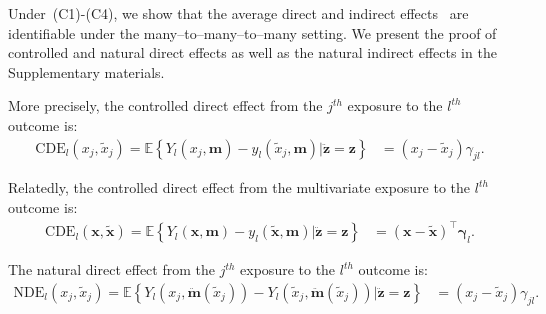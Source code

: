 \documentclass[
  12pt]{article}
\def\E{\mathbb{E}}
\def\M{\mathbf{m}}
\def\m{\mathbf{m}}
\def\Y{\mathbf{y}}
\def\Z{\mathbf{z}}
\begin{document}

Under~(C1)-(C4), we show that the average direct and indirect effects~\citep{imai2010identification,vanderweele2015explanation} are identifiable under the many--to--many--to--many setting. We present the proof of controlled and natural direct effects as well as the natural indirect effects in the Supplementary materials.

More precisely, the controlled direct effect from the $j^{th}$ exposure to the $l^{th}$ outcome is:
\begin{align*}
\text{CDE}_l(x_j, \widetilde{x}_j) =
\E \left \{ Y_l(x_j, \m) -y_l(\widetilde{x}_j, \m) \big| \ddot{\mathbf{z}} = \mathbf{z} \right \}
&= (x_j - \widetilde{x}_j) \gamma_{jl}.
\nonumber
\end{align*}

Relatedly, the controlled direct effect from the multivariate exposure to the $l^{th}$ outcome is:
\begin{align*}
\text{CDE}_l(\mathbf{x}, \widetilde{\mathbf{x}}) = \E \left \{ Y_l(\mathbf{x}, \m) -y_l(\widetilde{\mathbf{x}}, \m) \big| \ddot{\mathbf{z}} = \mathbf{z} \right \}
&= (\mathbf{x} - \widetilde{\mathbf{x}})^{\top}  \bm{\gamma}_{l}.
\nonumber
\end{align*}

The natural direct effect from the $j^{th}$ exposure to the $l^{th}$ outcome is:
\begin{align*}
\text{NDE}_l(x_j, \widetilde{x}_j) = \E \left \{ Y_l(x_j,\ddot{\mathbf{m}}(\widetilde{x}_j)) - Y_l(\widetilde{x}_j,\ddot{\mathbf{m}}(\widetilde{x}_j)) \big| \ddot{\mathbf{z}} = \mathbf{z} \right \}
&=
(x_j - \widetilde{x}_j)  \gamma_{jl}.
\end{align*}
\end{document}
